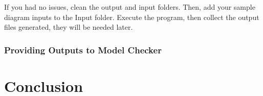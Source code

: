 \documentclass[11pt]{article}
\begin{document}
    If you had no issues, clean the output and input folders.
    Then, add your sample diagram inputs to the Input folder.
    Execute the program, then collect the output files generated, they will be needed later.

    \subsubsection{Providing Outputs to Model Checker}

    \section{Conclusion}\label{sec:conclusion}
    
\end{document}
